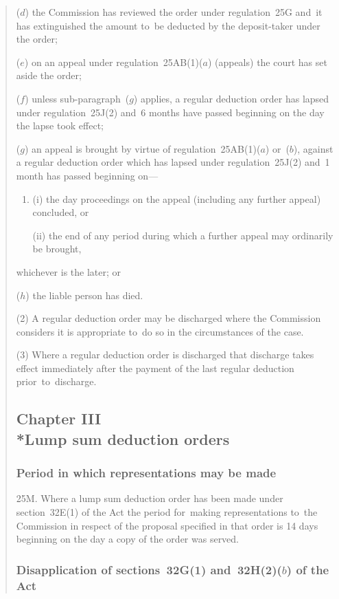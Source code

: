 \documentclass[12pt,a4paper]{article}
\begin{document}
\begin{quotation}
\begin{enumerate}
($d$) the Commission has reviewed the order under regulation~25G and~it has extinguished the amount to~be deducted by the deposit-taker under the order;

($e$) on an appeal under regulation~25AB(1)($a$)  (appeals) the court has set aside the order;

($f$) unless sub-paragraph~($g$)  applies, a regular deduction order has lapsed under regulation~25J(2) and~6 months have passed beginning on the day the lapse took effect;

($g$) an appeal is brought by virtue of regulation~25AB(1)($a$)  or~($b$), against a regular deduction order which has lapsed under regulation~25J(2) and~1 month has passed beginning on—
\begin{enumerate}\item[]
(i) the day proceedings on the appeal (including any further appeal) concluded, or

(ii) the end of any period during which a further appeal may ordinarily be brought,
\end{enumerate}
whichever is the later; or

($h$) the liable person has died.
\end{enumerate}

(2) A regular deduction order may be discharged where the Commission considers it is appropriate to~do so in the circumstances of the case.

(3) Where a regular deduction order is discharged that discharge takes effect immediately after the payment of the last regular deduction prior~to~discharge.

\subsection*{Chapter III\\*Lump sum deduction orders}

\subsubsection*{Period in which representations may be made}

25M.  Where a lump sum deduction order has been made under section~32E(1) of the Act the period for~making representations to~the Commission in respect of the proposal specified in that order is 14 days beginning on the day a copy of the order was served.

\subsubsection*{Disapplication of sections~32G(1) and~32H(2)($b$)  of the Act}


\end{quotation}
\end{document}
